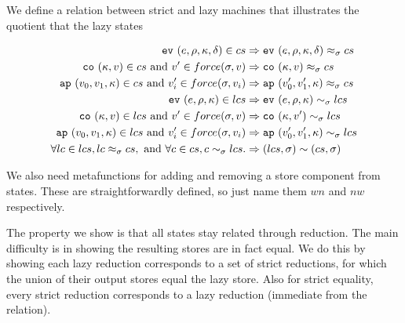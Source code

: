 \documentclass[preprint,onecolumn,9pt]{sigplanconf} %
\begin{document}
We define a relation between strict and lazy machines that illustrates
the quotient that the lazy states 

\newcommand{\lapprx}[3]{#1 \approx_{#2} #3}
\newcommand{\apprx}[3]{#1 \sim_{#2} #3}
\newcommand{\capprx}[2]{#1 \sim #2}

\begin{align*}
\ev{\mexp, \menv, \mkont, \mcntr} \in cs &\Rightarrow \lapprx{\ev{\mexp, \menv,\mkont, \mcntr}}{\msto}{cs} \\
\co{\mkont, \mval} \in cs \mbox{ and } \mval' \in force(\msto, \mval) &\Rightarrow \lapprx{\co{\mkont, \mval}}{\msto}{cs} \\
\ap{\mval_0, \mval_1, \mkont} \in cs \mbox{ and } \mval_i' \in force(\msto, \mval_i) &\Rightarrow \lapprx{\ap{\mval_0', \mval_1', \mkont}}{\msto}{cs} \\
\ev{\mexp, \menv, \mkont} \in lcs &\Rightarrow \apprx{\ev{\mexp, \menv,\mkont}}{\msto}{lcs} \\
\co{\mkont, \mval} \in lcs \mbox { and } \mval' \in force(\msto, \mval) &\Rightarrow \apprx{\co{\mkont, \mval'}}{\msto}{lcs} \\
\ap{\mval_0, \mval_1, \mkont} \in lcs \mbox { and } \mval_i' \in force(\msto, \mval_i) &\Rightarrow \apprx{\ap{\mval_0', \mval_1', \mkont}}{\msto}{lcs} \\
\forall lc \in lcs, \lapprx{lc}{\msto}{cs}, \mbox{ and }\forall c \in cs, \apprx{c}{\msto}{lcs}. &\Rightarrow \capprx{(lcs, \msto)}{(cs, \msto)}
\end{align*}

We also need metafunctions for adding and removing a store component
from states. These are straightforwardly defined, so just name them
$wn$ and $nw$ respectively.

The property we show is that all states stay related through
reduction. The main difficulty is in showing the resulting stores are
in fact equal. We do this by showing each lazy reduction corresponds
to a set of strict reductions, for which the union of their output
stores equal the lazy store. Also for strict equality, every strict
reduction corresponds to a lazy reduction (immediate from the relation).
\end{document}
